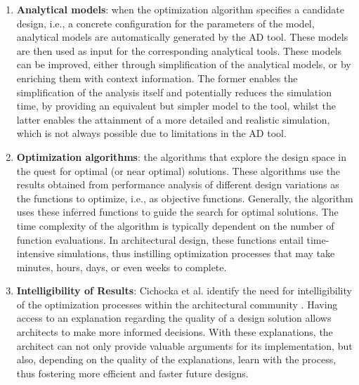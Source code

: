 \begin{enumerate}
\item \textbf{Analytical models}: when the optimization algorithm specifies a candidate design, i.e., a concrete configuration for the parameters of the model, analytical models are automatically generated by the \ac{AD} tool. These models are then used as input for the corresponding analytical tools. These models can be improved, either through simplification of the analytical models, or by enriching them with context information. The former enables the simplification of the analysis itself and potentially reduces the simulation time, by providing an equivalent but simpler model to the tool, whilst the latter enables the attainment of a more detailed and realistic simulation, which is not always possible due to limitations in the \ac{AD} tool. 

\item \textbf{Optimization algorithms}: the algorithms that explore the design space in the quest for optimal (or near optimal) solutions. These algorithms use the results obtained from performance analysis of different design variations as the functions to optimize, i.e., as objective functions. Generally, the algorithm uses these inferred functions to guide the search for optimal solutions. The time complexity of the algorithm is typically dependent on the number of function evaluations. In architectural design, these functions entail time-intensive simulations, thus instilling optimization processes that may take minutes, hours, days, or even weeks to complete.

\item \textbf{Intelligibility of Results}: Cichocka et al. identify the need for intelligibility of the optimization processes within the architectural community \cite{Cichocka2017SURVEY}. Having access to an explanation regarding the quality of a design solution allows architects to make more informed decisions. With these explanations, the architect can not only provide valuable arguments for its implementation, but also, depending on the quality of the explanations, learn with the process, thus fostering more efficient and faster future designs. 


\end{enumerate}

